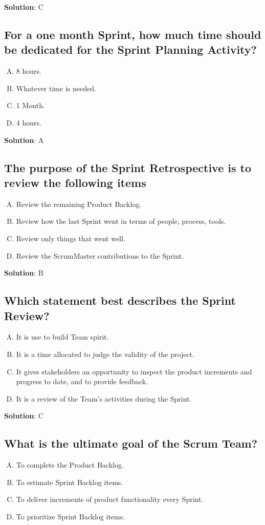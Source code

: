 \textbf{Solution}: C


\subsection{For a one month Sprint, how much time should be dedicated for the Sprint Planning Activity?}
\begin{enumerate}[A)]
  \item 8 hours.
  \item Whatever time is needed.
  \item 1 Month.
  \item 4 hours.
\end{enumerate}


\textbf{Solution}: A


\subsection{The purpose of the Sprint Retrospective is to review the following items}
\begin{enumerate}[A)]
  \item Review the remaining Product Backlog.
  \item Review how the last Sprint went in terms of people, process, tools.
  \item Review only things that went well.
  \item Review the ScrumMaster contributions to the Sprint.
\end{enumerate}


\textbf{Solution}: B


\subsection{Which statement best describes the Sprint Review?}
\begin{enumerate}[A)]
  \item It is use to build Team spirit.
  \item It is a time allocated to judge the validity of the project.
  \item It gives stakeholders an opportunity to inspect the product increments and progress to date, and to provide feedback.
  \item It is a review of the Team's activities during the Sprint.
\end{enumerate}


\textbf{Solution}: C


\subsection{What is the ultimate goal of the Scrum Team?}
\begin{enumerate}[A)]
  \item To complete the Product Backlog.
  \item To estimate Sprint Backlog items.
  \item To deliver increments of product functionality every Sprint.
  \item To prioritize Sprint Backlog items.
\end{enumerate}


